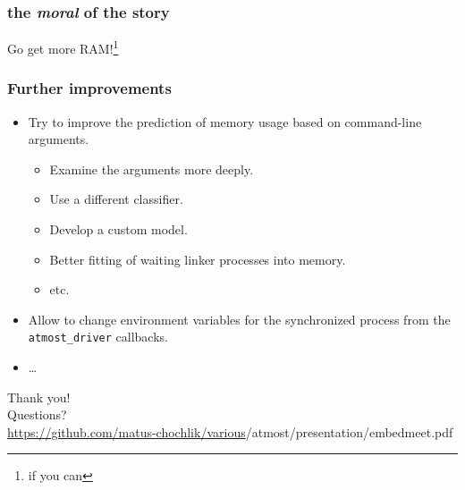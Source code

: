\documentclass[compress,table,xcolor=table]{beamer}
\newcommand{\shelltext}[1]{\texttt{\colorbox{light-gray}{#1}}}
\begin{document}
\begin{frame}
  \frametitle{the {\em \LARGE moral} of the story}
  \centering
  \Huge
	Go get more RAM!\footnote{if you can}
\end{frame}
\begin{frame}
  \frametitle{Further improvements}
  \begin{itemize}
    \Large
    \item Try to improve the prediction of memory usage based on command-line
      arguments.
    \begin{itemize}
      \large
      \item Examine the arguments more deeply.
      \item Use a different classifier.
      \item Develop a custom model.
      \item Better fitting of waiting linker processes into memory.
      \item etc.
    \end{itemize}
    \item Allow to change environment variables for the synchronized process
      from the \shelltext{atmost\_driver} callbacks.
    \item \ldots
  \end{itemize}
\end{frame}
\begin{frame}
  \centering
  \Huge
  Thank you!\\Questions?\\
  \vfill
  \Large
  \url{https://github.com/matus-chochlik/various}/atmost/presentation/embedmeet.pdf
\end{frame}
\end{document}
